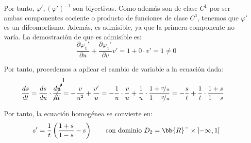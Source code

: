 \begin{ejercicio}
    Por tanto, $\varphi', (\varphi')^{-1}$ son biyectivas. Como además son de clase $C^1$ por ser ambas componentes cociente o producto de funciones de clase $C^1$, tenemos que $\varphi'$ es un difeomorfismo. Además, es admisible, ya que la primera componente no varía. La demostración de que es admisible es:
    \begin{equation*}
        \dfrac{\partial \varphi_1'}{\partial u} + \dfrac{\partial \varphi_1'}{\partial v} v' = 1 + 0\cdot v'=1 \neq 0
    \end{equation*}

    Por tanto, procedemos a aplicar el cambio de variable a la ecuación dada:
    \begin{align*}
        \dfrac{ds}{dt} &= \dfrac{ds}{du}\cdot \cancelto{1}{\dfrac{du}{dt}} = -\dfrac{v}{u^2} + \dfrac{v'}{u} = -\dfrac{1}{u}\cdot \dfrac{v}{u} + \dfrac{1}{u}\cdot \dfrac{1+\nicefrac{v}{u}}{1-\nicefrac{v}{u}} = -\dfrac{s}{t} + \dfrac{1}{t}\cdot \dfrac{1+s}{1-s} 
    \end{align*}

    Por tanto, la ecuación homogénea se convierte en:
    \begin{equation*}
        s' = \dfrac{1}{t}\left(\dfrac{1+s}{1-s} - s\right) \qquad \text{con dominio } D_2=\bb{R}^- \times \left]-\infty,1\right[
    \end{equation*}


\end{ejercicio}
